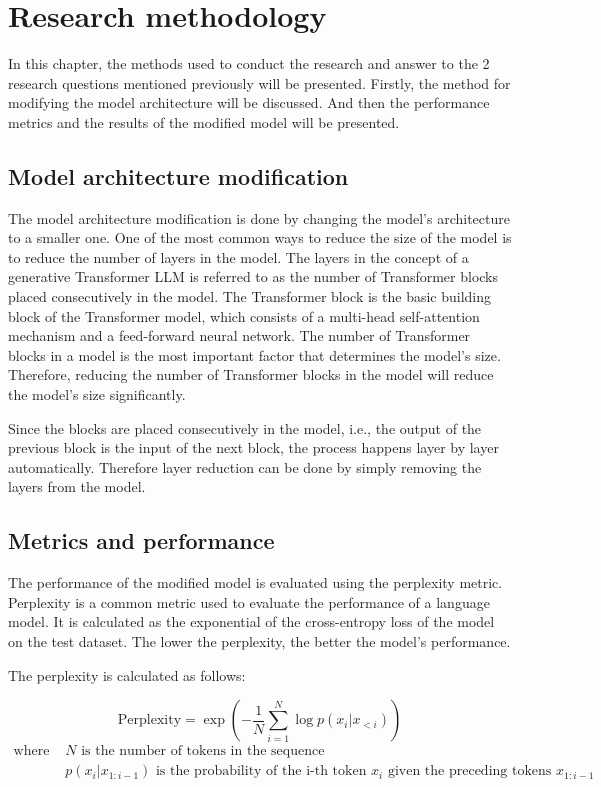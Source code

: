 \chapter{Research methodology}
In this chapter, the methods used to conduct the research and answer to the 2 research questions mentioned previously will be presented. Firstly, the method for modifying the model architecture will be discussed. And then the performance metrics and the results of the modified model will be presented.

\section{Model architecture modification}
The model architecture modification is done by changing the model's architecture to a smaller one. One of the most common ways to reduce the size of the model is to reduce the number of layers in the model. The layers in the concept of a generative Transformer LLM is referred to as the number of Transformer blocks placed consecutively in the model. The Transformer block is the basic building block of the Transformer model, which consists of a multi-head self-attention mechanism and a feed-forward neural network. The number of Transformer blocks in a model is the most important factor that determines the model's size. Therefore, reducing the number of Transformer blocks in the model will reduce the model's size significantly. \par 
Since the blocks are placed consecutively in the model, i.e., the output of the previous block is the input of the next block, the process happens layer by layer automatically. Therefore layer reduction can be done by simply removing the layers from the model. \par

\section{Metrics and performance}
The performance of the modified model is evaluated using the perplexity metric. Perplexity is a common metric used to evaluate the performance of a language model. It is calculated as the exponential of the cross-entropy loss of the model on the test dataset. The lower the perplexity, the better the model's performance. \par
The perplexity is calculated as follows:

\begin{equation}
    \text{Perplexity} = \exp\left(-\frac{1}{N}\sum_{i=1}^N \log p(x_i|x_{<i})\right)
\end{equation}
\begin{align*}
    \text{where } &N \text{ is the number of tokens in the sequence} \\
    &p(x_i|x_{1:i-1}) \text{ is the probability of the i-th token } x_i \text{ given the preceding tokens } x_{1:i-1}
\end{align*}

